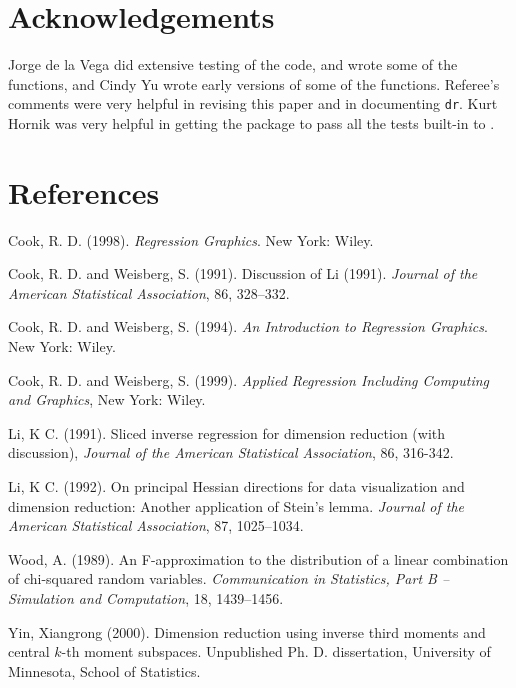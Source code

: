 \documentclass{article}
\newcommand{\dr}{{\tt dr}}
\newenvironment{references}{%
  \section{References}%
    \begin{list}%
            {}%
            {\setlength{\leftmargin}{.25in}\setlength{\itemindent}{-.25in}}}%
   {\end{list}}
\newcommand{\jasa} {{\it Journal of the American Statistical Association}}
\begin{document}
\section{Acknowledgements}
Jorge de la Vega did extensive testing of the code, and wrote some of the
functions, and Cindy Yu wrote early versions of some of the functions.
Referee's comments were very helpful in revising this paper and in
documenting \dr.  Kurt Hornik was very helpful in getting the package to
pass all the tests built-in to \R.


\begin{references}


\item Cook, R. D. (1998). {\it Regression Graphics}.  New York:  Wiley.

\item Cook, R. D. and Weisberg, S. (1991).  Discussion of Li (1991).
\jasa, 86, 328--332.

\item Cook, R. D. and Weisberg, S. (1994).  {\it An Introduction to
Regression Graphics}.  New York:  Wiley.

\item Cook, R. D. and Weisberg, S. (1999). {\it Applied Regression
Including Computing and Graphics},  New York:  Wiley.

\item Li, K C. (1991).  Sliced inverse regression for dimension reduction
(with discussion), \jasa, 86, 316-342.

\item Li, K C. (1992).  On principal Hessian directions for data
visualization and dimension reduction:  Another application of Stein's
lemma.  \jasa, 87, 1025--1034.

\item Wood, A. (1989).  An F-approximation to the distribution of a linear
combination of chi-squared random variables.  {\em Communication in
Statistics, Part B -- Simulation and Computation}, 18, 1439--1456.

\item Yin, Xiangrong (2000).  Dimension reduction using inverse third
moments and central $k$-th moment subspaces.  Unpublished Ph. D.
dissertation, University of Minnesota, School of Statistics.
\end{references}
\end{document}
